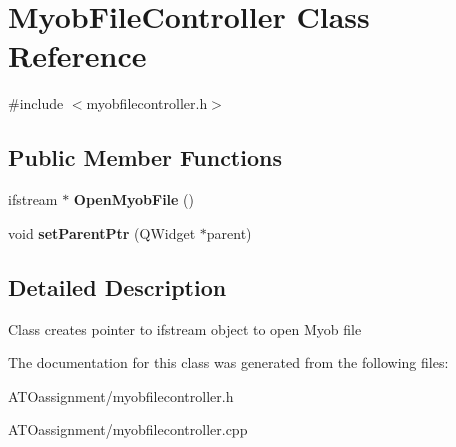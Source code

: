 \hypertarget{class_myob_file_controller}{}\section{Myob\+File\+Controller Class Reference}
\label{class_myob_file_controller}


{\ttfamily \#include $<$myobfilecontroller.\+h$>$}

\subsection*{Public Member Functions}
\begin{DoxyCompactItemize}
\item 
\hypertarget{class_myob_file_controller_a931398570ccda783b8b1add583fe28b7}{}\label{class_myob_file_controller_a931398570ccda783b8b1add583fe28b7} 
ifstream $\ast$ {\bfseries Open\+Myob\+File} ()
\item 
\hypertarget{class_myob_file_controller_a41b5275e6e58bf5a8c5bc2b02fad84c6}{}\label{class_myob_file_controller_a41b5275e6e58bf5a8c5bc2b02fad84c6} 
void {\bfseries set\+Parent\+Ptr} (Q\+Widget $\ast$parent)
\end{DoxyCompactItemize}


\subsection{Detailed Description}
Class creates pointer to ifstream object to open Myob file 

The documentation for this class was generated from the following files\+:\begin{DoxyCompactItemize}
\item 
A\+T\+Oassignment/myobfilecontroller.\+h\item 
A\+T\+Oassignment/myobfilecontroller.\+cpp\end{DoxyCompactItemize}
